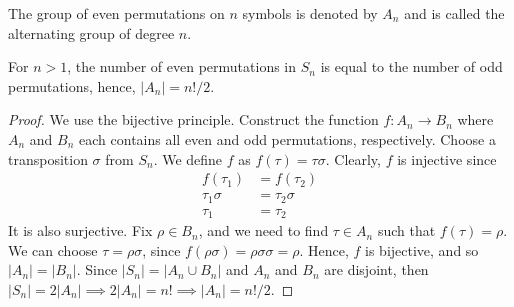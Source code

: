     \begin{dfn}
        The group of even permutations on \(n\) symbols is denoted by \(A_n\) and is called the alternating group of degree \(n\).
    \end{dfn}

    \begin{thm}
        For \(n > 1\), the number of even permutations in \(S_n\) is equal to the number of odd permutations, hence, \(|A_n| = n!/2\).
    \end{thm}

    \begin{proof}
        We use the bijective principle. Construct the function \(f : A_n \to  B_n\) where \(A_n\) and \(B_n\) each contains all even and odd permutations, respectively. Choose a transposition \(\sigma\) from \(S_n\). We define \(f\) as \(f(\tau) = \tau\sigma\). Clearly, \(f\) is injective since
        \begin{align*}
            f(\tau_1) &= f(\tau_2) \\
            \tau_1\sigma &= \tau_2\sigma \\
            \tau_1 &= \tau_2
        \end{align*}
        It is also surjective. Fix \(\rho \in B_n\), and we need to find \(\tau\in A_n\) such that \(f(\tau) = \rho\). We can choose \(\tau = \rho\sigma\), since \(f(\rho\sigma) = \rho\sigma\sigma = \rho\). Hence, \(f\) is bijective, and so \(|A_n| = |B_n|\). Since \(|S_n| = |A_n \cup B_n|\) and \(A_n\) and \(B_n \) are disjoint, then \(|S_n| = 2|A_n| \implies 2|A_n| = n! \implies |A_n| = n!/2\).
    \end{proof}